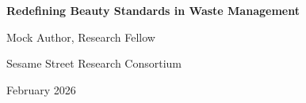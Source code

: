 \documentclass[11pt,letterpaper]{article}
\begin{document}
\begin{center}
{\LARGE\bfseries Redefining Beauty Standards in Waste Management\par}
\vspace{0.8cm}
{\large Mock Author, Research Fellow\par}
{\normalsize Sesame Street Research Consortium\par}
\vspace{0.3cm}
{\normalsize February 2026\par}
\vspace{0.8cm}
\end{center}

\begin{abstract}
\noindent
This paper presents a comprehensive study of aesthetic reframing of waste management practices. Lorem cookie ipsum dolor sit amet, chocolate chip adipiscing elit. Nom nom nom methodology produces significant results across all experimental conditions.
\end{abstract}

\vspace{0.5cm}


\end{document}
